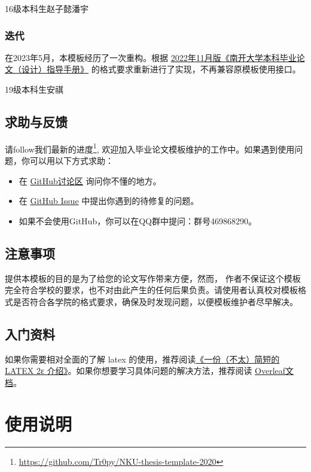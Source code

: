 \documentclass{nktba}
\begin{document}
\hfill 16级本科生\quad 赵子懿\quad 潘宇

\subsubsection{迭代}

在2023年5月，本模板经历了一次重构。根据 \href{http://jwc.nankai.edu.cn/2022/1124/c24a497818/page.htm}{2022年11月版《南开大学本科毕业论文（设计）指导手册》} 的格式要求重新进行了实现，不再兼容原模板使用接口。

\hfill 19级本科生\quad 安祺

\subsection{求助与反馈}

请follow我们最新的进度\footnote{\url{https://github.com/Tr0py/NKU-thesis-template-2020}}, 
欢迎加入毕业论文模板维护的工作中。如果遇到使用问题，你可以用以下方式求助：
\begin{itemize}
  \item 在 \href{https://github.com/Tr0py/NKU-thesis-template-2020/discussions}{GitHub讨论区} 询问你不懂的地方。
  \item 在 \href{https://github.com/Tr0py/NKU-thesis-template-2020/issues}{GitHub Issue} 中提出你遇到的待修复的问题。
  \item 如果不会使用GitHub，你可以在QQ群中提问：群号469868290。
\end{itemize}

\subsection{注意事项}

提供本模板的目的是为了给您的论文写作带来方便，然而，
作者不保证这个模板完全符合学校的要求，也不对由此产生的任何后果负责。请使用者认真校对模板格式是否符合各学院的格式要求，确保及时发现问题，以便模板维护者尽早解决。

\subsection{入门资料}

如果你需要相对全面的了解 latex 的使用，推荐阅读\href{http://mirrors.ctan.org/info/lshort/chinese/lshort-zh-cn.pdf}{《一份（不太）简短的 LATEX 2ε 介绍》}。如果你想要学习具体问题的解决方法，推荐阅读 \href{https://www.overleaf.com/learn}{Overleaf文档}。

\section{使用说明} \label{chpt:A}
\end{document}
